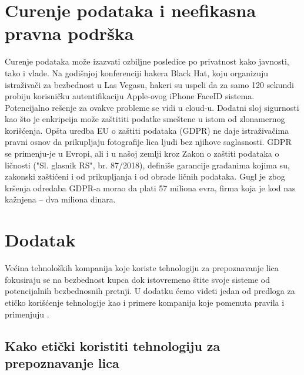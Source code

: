 \documentclass{article}
\begin{document}
\newpage

\section{Curenje podataka i neefikasna pravna podrška}

Curenje podataka može izazvati ozbiljne posledice po privatnost kako javnosti, tako i vlade.
\newline
\newline
Na godišnjoj konferenciji hakera Black Hat, koju organizuju istraživači za bezbednost u Las Vegasu, hakeri su uspeli da za samo 120 sekundi probiju korisničku autentifikaciju Apple-ovog iPhone FaceID sistema. Potencijalno rešenje za ovakve probleme se vidi u cloud-u. Dodatni sloj sigurnosti kao što je enkripcija može zaštititi podatke smeštene u istom od zlonamernog korišćenja. \cite{sedma}
\newline
\newline
Opšta uredba EU o zaštiti podataka (GDPR) ne daje istraživačima pravni osnov da prikupljaju fotografije lica ljudi bez njihove saglasnosti. GDPR se primenju-je u Evropi, ali i u našoj zemlji kroz Zakon o zaštiti podataka o ličnosti ("Sl. glasnik RS", br. 87/2018), definiše garancije građanima kojima su, zakonski zaštićeni i od prikupljanja i od obrade ličnih podataka. Gugl je zbog kršenja odredaba GDPR-a morao da plati 57 miliona evra, firma koja je kod nas kažnjena – dva miliona dinara. \cite{osma}

\newpage

\section{Dodatak }

Većina tehnoloških kompanija koje koriste tehnologiju za prepoznavanje lica fokusiraju se na bezbednost kupca dok istovremeno štite svoje sisteme od potencijalnih bezbednosnih pretnji. U dodatku ćemo videti jedan od predloga za etičko korišćenje tehnologije kao i primere kompanija koje pomenuta pravila i primenjuju \cite{sedma}.


\subsection{Kako etički koristiti tehnologiju za prepoznavanje lica}
\end{document}
